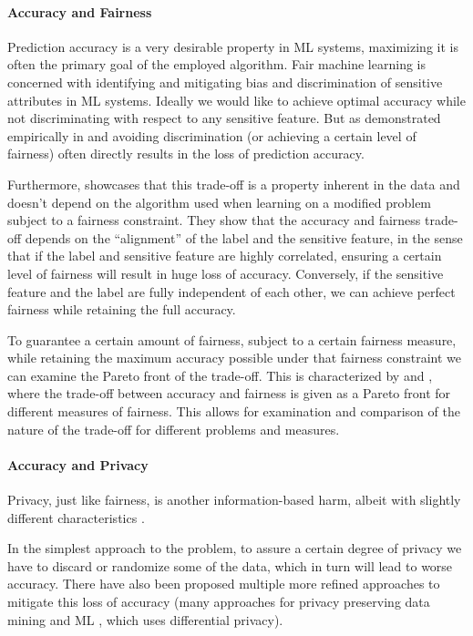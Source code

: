 	\paragraph{Accuracy and Fairness}
	Prediction accuracy is a very desirable property in ML systems, maximizing it is often the primary goal of the employed algorithm.
	Fair machine learning is concerned with identifying and mitigating bias and discrimination of sensitive attributes in ML systems.
	Ideally we would like to achieve optimal accuracy while not discriminating with respect to any sensitive feature.
	But as demonstrated empirically in \eg \cite{kamiran2010discrimination} and \cite{zliobaite2015relation} avoiding discrimination (or achieving a certain level of fairness) often directly results in the loss of prediction accuracy.

	Furthermore, \cite{menon2018cost} showcases that this trade-off is a property inherent in the data and doesn't depend on the algorithm used when learning on a modified problem subject to a fairness constraint.
	They show that the accuracy and fairness trade-off depends on the \enquote{alignment} of the label and the sensitive feature, in the sense that if the label and sensitive feature are highly correlated, ensuring a certain level of fairness will result in huge loss of accuracy.
	Conversely, if the sensitive feature and the label are fully independent of each other, we can achieve perfect fairness while retaining the full accuracy.

	To guarantee a certain amount of fairness, subject to a certain fairness measure, while retaining the maximum accuracy possible under that fairness constraint we can examine the Pareto front of the trade-off. 	
	This is characterized by \cite{liu2020accuracy} and \cite{wei2020fairness}, where the trade-off between accuracy and fairness is given as a Pareto front for different measures of fairness.
	This allows for examination and comparison of the nature of the trade-off for different problems and measures.
	

	\paragraph{Accuracy and Privacy}
	Privacy, just like fairness, is another information-based harm, albeit with slightly different characteristics \cite{van2008information}.

	In the simplest approach to the problem, to assure a certain degree of privacy we have to discard or randomize some of the data, which in turn will lead to worse accuracy.
	There have also been proposed multiple more refined approaches to mitigate this loss of accuracy (many approaches for privacy preserving data mining and ML \eg \cite{duchi2014privacy}, which uses differential privacy).

